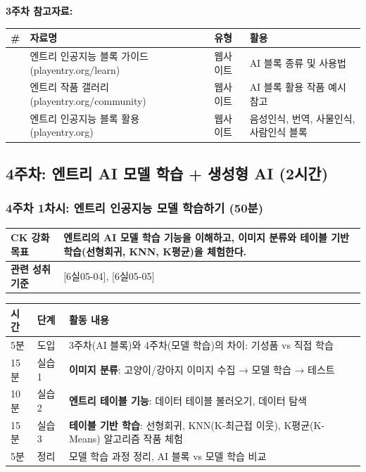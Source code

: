\documentclass[a4paper,11pt]{article}
\begin{document}
\textbf{3주차 참고자료:}

{\small\noindent
\begin{tabularx}{\textwidth}{|>{\centering\arraybackslash}p{0.5cm}|X|p{2.3cm}|X|}
\hline
\textbf{\#} & \textbf{자료명} & \textbf{유형} & \textbf{활용} \\ \hline
1 & 엔트리 인공지능 블록 가이드 (playentry.org/learn) & 웹사이트 & AI 블록 종류 및 사용법 \\ \hline
2 & 엔트리 작품 갤러리 (playentry.org/community) & 웹사이트 & AI 블록 활용 작품 예시 참고 \\ \hline
3 & 엔트리 인공지능 블록 활용 (playentry.org) & 웹사이트 & 음성인식, 번역, 사물인식, 사람인식 블록 \\ \hline
\end{tabularx}
}

\subsection{4주차: 엔트리 AI 모델 학습 + 생성형 AI (2시간)}

\subsubsection{4주차 1차시: 엔트리 인공지능 모델 학습하기 (50분)}

\noindent
\begin{tabularx}{\textwidth}{|>{\bfseries\arraybackslash}p{2.5cm}|X|}
\hline
CK 강화 목표 & 엔트리의 AI 모델 학습 기능을 이해하고, 이미지 분류와 테이블 기반 학습(선형회귀, KNN, K평균)을 체험한다. \\ \hline
관련 성취기준 & {[6실05-04]}, {[6실05-05]} \\ \hline
\end{tabularx}

\vspace{0.3em}\noindent
\begin{tabularx}{\textwidth}{|>{\centering\arraybackslash}p{1cm}|>{\centering\arraybackslash}p{1.5cm}|X|}
\hline
\textbf{시간} & \textbf{단계} & \textbf{활동 내용} \\ \hline
5분 & 도입 & 3주차(AI 블록)와 4주차(모델 학습)의 차이: 기성품 vs 직접 학습 \\ \hline
15분 & 실습 1 & \textbf{이미지 분류}: 고양이/강아지 이미지 수집 → 모델 학습 → 테스트 \\ \hline
10분 & 실습 2 & \textbf{엔트리 테이블 기능}: 데이터 테이블 불러오기, 데이터 탐색 \\ \hline
15분 & 실습 3 & \textbf{테이블 기반 학습}: 선형회귀, KNN(K-최근접 이웃), K평균(K-Means) 알고리즘 작품 체험 \\ \hline
5분 & 정리 & 모델 학습 과정 정리, AI 블록 vs 모델 학습 비교 \\ \hline
\end{tabularx}
\end{document}
